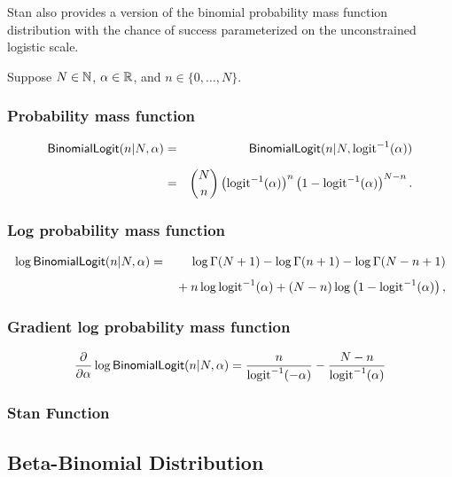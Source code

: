Stan also provides a version of the binomial probability mass function
distribution with the chance of success parameterized on the
unconstrained logistic scale.  

Suppose $N \in \mathbb{N}$, $\alpha \in \mathbb{R}$, and $n \in
\{0,\ldots,N\}$.

\subsubsection{Probability mass function}
\begin{eqnarray*}
\mbox{\sf BinomialLogit}(n|N,\alpha)
& = & \mbox{\sf BinomialLogit}(n|N,\mbox{logit}^{-1}(\alpha))
\\[6pt]
& = & {N \choose n} \left( \mbox{logit}^{-1}(\alpha) \right)^{n}
                    \left( 1 - \mbox{logit}^{-1}(\alpha) \right)^{N - n}.
\end{eqnarray*}
%
\subsubsection{Log probability mass function}
\begin{eqnarray*}
\log \mbox{\sf BinomialLogit}(n|N,\alpha)
& = &
\log \Gamma(N+1) - \log \Gamma(n + 1) - \log \Gamma(N- n + 1)
\\[4pt]
& & { } + n \log \mbox{logit}^{-1}(\alpha) + (N - n) \log \left( 1 -
  \mbox{logit}^{-1}(\alpha) \right), 
\end{eqnarray*}
%
\subsubsection{Gradient log probability mass function}
%
\[
\frac{\partial}{\partial \alpha} \log \mbox{\sf BinomialLogit}(n|N,\alpha)
= \frac{n}{\mbox{logit}^{-1}(-\alpha)}
- \frac{N - n}{\mbox{logit}^{-1}(\alpha)}
\]
%
\subsubsection{Stan Function}
%
\begin{description}
%
%
\end{description}


\subsection{Beta-Binomial Distribution}

